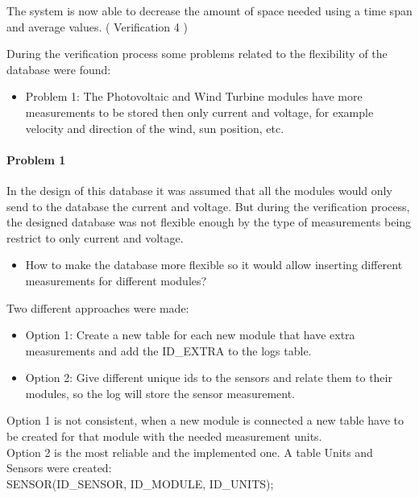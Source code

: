 The system is now able to decrease the amount of space needed using a time span and average values. ( Verification 4 )

During the verification process some problems related to the flexibility of the database were found:
	\begin{itemize}
		\item Problem 1: The Photovoltaic and Wind Turbine modules have more measurements to be stored then only current and voltage, for example velocity and direction of the wind, sun position, etc.
 	\end{itemize}

\paragraph{Problem 1}
In the design of this database it was assumed that all the modules would only send to the database the current and voltage. But during the verification process, the designed database was not flexible enough by the type of measurements being restrict to only current and voltage.

	\begin{itemize}
		\item How to make the database more flexible so it would allow inserting different measurements for different modules?
	\end{itemize}

Two different approaches were made:
	
	\begin{itemize}
		\item Option 1: Create a new table for each new module that have extra measurements and add the ID\_EXTRA to the logs table.
		\item Option 2: Give different unique ids to the sensors and relate them to their modules, so the log will store the sensor measurement.
	\end{itemize}

Option 1 is not consistent, when a new module is connected a new table have to be created for that module with the needed measurement units.\\

Option 2 is the most reliable and the implemented one. A table Units and Sensors were created:\\

SENSOR(ID\_SENSOR, ID\_MODULE, ID\_UNITS);


